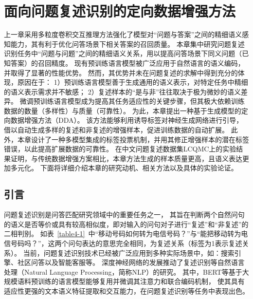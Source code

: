 \chapter{面向问题复述识别的定向数据增强方法}

上一章采用多粒度卷积交互推理方法强化了模型对“问题与答案”之间的精细语义感知能力，其有利于优化问答场景下相关答案的召回质量。
本章集中研究问题复述识别任务中“问题与问题”之间的精细语义关系，用以提高问答场景下同义问题（已知答案）的召回精度。
现有预训练语言模型被广泛应用于自然语言的语义编码，并取得了显著的性能优势。
然而，其优势并未在问题复述的求解中得到充分的体现，原因在于：
1）预训练语言模型善于生成通用的语义表示，对特定任务中精细的语义表示需求并不敏感；
2）复述样本的“是与非”往往取决于极为微妙的语义差异。
微调预训练语言模型成为提高其任务适应性的关键步骤，但其极大依赖训练数据的数量（多样性）与质量（可靠性）。
为此，本章提出一种基于生成模型的定向数据增强方法（DDA）。
该方法能够利用诱导标签对神经生成网络进行引导，借以自动生成多样的复述和非复述的增强样本，促进训练数据的自动扩展。
此外，本章设计了一种多模型集成的标签投票机制，并用其修正增强样本的潜在标签错误，以此提高扩展数据的可靠性。
在中文问题复述数据集LCQMC上的实验结果证明，与传统数据增强方案相比，本章方法生成的样本质量更高，且语义表达更加多元化。
下面将详细介绍本章的研究动机、相关方法以及具体的实验论证。

\section{引言}

问题复述识别是问答匹配研究领域中的重要任务之一，
其旨在判断两个自然问句的语义是否等价或具有较高相似度，即对输入的问句对子进行“复述”和“非复述”的二相判别。
如表~\ref{table4-1}~中{\kai“移动号码如何转为电信号码？”}与{\kai“能把移动转为电信号码吗？”}，这两个问句表达的意思完全相同，为复述关系（标签为1表示复述关系）。
当前，问题复述识别技术已经被广泛应用到多种实际场景中，如：搜索引擎、社区问答以及智能客服等。
深度神经网络的发展推动了复述识别等自然语言处理（Natural Language Processing，简称NLP）的研究。
其中，BERT\cite{devlin2018bert}等基于大规模语料预训练的语言模型能够复用并微调其注意力和联合编码机制，
使其具有适应性更强的文本语义特征提取和交互能力，在问题复述识别等任务中表现出色。



